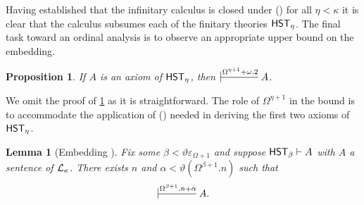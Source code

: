 \documentclass[UKenglish,cleveref,DIV=12]{scrartcl}
\newtheorem{lemma}[theorem]{Lemma}%
\newtheorem{proposition}[lemma]{Proposition}
\theoremstyle{definition}
\theoremstyle{definition}
\newcommand{\gelhighlight}[1]{\highlight[magenta]{#1}}
\begin{document}
Having established that the infinitary calculus is closed under (\Conec\eta) for all $\eta<\kappa$ it is clear that the calculus subsumes each of the finitary theories $\mathsf{HST}_\eta$. 
The final task toward an ordinal analysis is to observe an appropriate upper bound on the embedding.
\begin{proposition}\label{embed-axioms}
	 If $A$ is an axiom of $\mathsf{HST}_\eta$, then $\prov{\Omega^{\eta+1} + \omega.2} A$.
\end{proposition}
We omit the proof of \cref{embed-axioms} as it is straightforward. The role of \( \Omega^{\eta+1} \) in the bound is to accommodate the application of (\Nec\eta) needed in deriving the first two axioms of \( \mathsf{HST}_\eta \). \gelhighlight{Fill in axioms}
%
\begin{lemma}[Embedding ]\label{embed-lemma}
Fix some $\beta<\vartheta\varepsilon_{\Omega+1}$ and suppose $\mathsf{HST}_\beta\vdash A$ with $A$ a sentence of $\mathcal{L}_\kappa$. 
There exists \( n \) and \( \alpha < \vartheta(\Omega^{\beta+1}.n ) \) such that 
\[\prov{\Omega^{\beta+1}.n + \alpha } A . \]
\end{lemma}
\end{document}
